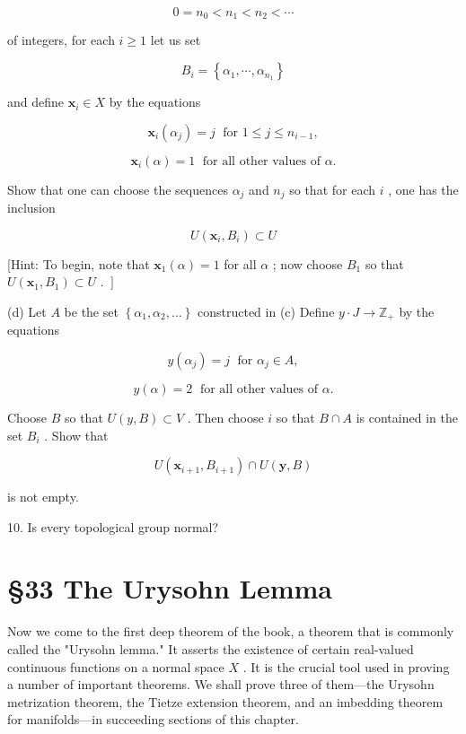 \documentclass[10pt]{article}
\begin{document}
\[
0 = {n}_{0} < {n}_{1} < {n}_{2} < \cdots
\]

of integers, for each \(i \geq  1\) let us set

\[
{B}_{i} = \left\{  {{\alpha }_{1},\cdots ,{\alpha }_{{n}_{1}}}\right\}
\]

and define \({\mathbf{x}}_{i} \in  X\) by the equations

\[
{\mathbf{x}}_{i}\left( {\alpha }_{j}\right)  = j\;\text{ for }1 \leq  j \leq  {n}_{i - 1},
\]

\[
{\mathbf{x}}_{i}\left( \alpha \right)  = 1\;\text{ for all other values of }\alpha .
\]

Show that one can choose the sequences \({\alpha }_{j}\) and \({n}_{j}\) so that for each \(i\) , one has the inclusion

\[
U\left( {{\mathbf{x}}_{i},{B}_{i}}\right)  \subset  U
\]

[Hint: To begin, note that \({\mathbf{x}}_{1}\left( \alpha \right)  = 1\) for all \(\alpha\) ; now choose \({B}_{1}\) so that \(\left. {U\left( {{\mathbf{x}}_{1},{B}_{1}}\right)  \subset  U\text{ . }}\right\rbrack\)

(d) Let \(A\) be the set \(\left\{  {{\alpha }_{1},{\alpha }_{2},\ldots }\right\}\) constructed in (c) Define \(y \cdot  J \rightarrow  {\mathbb{Z}}_{ + }\) by the equations

\[
y\left( {\alpha }_{j}\right)  = j\;\text{ for }{\alpha }_{j} \in  A,
\]

\[
y\left( \alpha \right)  = 2\;\text{ for all other values of }\alpha .
\]

Choose \(B\) so that \(U\left( {y,B}\right)  \subset  V\) . Then choose \(i\) so that \(B \cap  A\) is contained in the set \({B}_{i}\) . Show that

\[
U\left( {{\mathbf{x}}_{i + 1},{B}_{i + 1}}\right)  \cap  U\left( {\mathbf{y},B}\right)
\]

is not empty.

10. Is every topological group normal?

\section*{§33 The Urysohn Lemma}

Now we come to the first deep theorem of the book, a theorem that is commonly called the "Urysohn lemma." It asserts the existence of certain real-valued continuous functions on a normal space \(X\) . It is the crucial tool used in proving a number of important theorems. We shall prove three of them—the Urysohn metrization theorem, the Tietze extension theorem, and an imbedding theorem for manifolds—in succeeding sections of this chapter.
\end{document}
